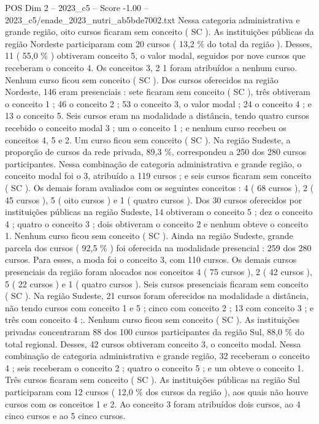 \begin{textsample}{POS Dim 2 – 2023\_c5 – Score -1.00 – 2023\_c5/enade\_2023\_nutri\_ab5bde7002.txt}
Nessa categoria administrativa e grande região, oito cursos ficaram sem conceito ( SC ).
As instituições públicas da região Nordeste participaram com 20 cursos ( 13,2 \% do total da região ).
Desses, 11 ( 55,0 \% ) obtiveram conceito 5, o valor modal, seguidos por nove cursos que receberam o conceito 4.
Os conceitos 3, 2 1 foram atribuídos a nenhum curso.
Nenhum curso ficou sem conceito ( SC ).
Dos cursos oferecidos na região Nordeste, 146 eram presenciais : sete ficaram sem conceito ( SC ), três obtiveram o conceito 1 ; 46 o conceito 2 ; 53 o conceito 3, o valor modal ; 24 o conceito 4 ; e 13 o conceito 5.
Seis cursos eram na modalidade a distância, tendo quatro cursos recebido o conceito modal 3 ; um o conceito 1 ; e nenhum curso recebeu os conceitos 4, 5 e 2.
Um curso ficou sem conceito ( SC ).
Na região Sudeste, a proporção de cursos da rede privada, 89,3 \%, correspondeu a 250 dos 280 cursos participantes.
Nessa combinação de categoria administrativa e grande região, o conceito modal foi o 3, atribuído a 119 cursos ; e seis cursos ficaram sem conceito ( SC ).
Os demais foram avaliados com os seguintes conceitos : 4 ( 68 cursos ), 2 ( 45 cursos ), 5 ( oito cursos ) e 1 ( quatro cursos ).
Dos 30 cursos oferecidos por instituições públicas na região Sudeste, 14 obtiveram o conceito 5 ; dez o conceito 4 ; quatro o conceito 3 ; dois obtiveram o conceito 2 e nenhum obteve o conceito 1.
Nenhum curso ficou sem conceito ( SC ).
Ainda na região Sudeste, grande parcela dos cursos ( 92,5 \% ) foi oferecida na modalidade presencial : 259 dos 280 cursos.
Para esses, a moda foi o conceito 3, com 110 cursos.
Os demais cursos presenciais da região foram alocados nos conceitos 4 ( 75 cursos ), 2 ( 42 cursos ), 5 ( 22 cursos ) e 1 ( quatro cursos ).
Seis cursos presenciais ficaram sem conceito ( SC ).
Na região Sudeste, 21 cursos foram oferecidos na modalidade a distância, não tendo cursos com conceito 1 e 5 ; cinco com conceito 2 ; 13 com conceito 3 ; e três com conceito 4 ;.
Nenhum curso ficou sem conceito ( SC ).
As instituições privadas concentraram 88 dos 100 cursos participantes da região Sul, 88,0 \% do total regional.
Desses, 42 cursos obtiveram conceito 3, o conceito modal.
Nessa combinação de categoria administrativa e grande região, 32 receberam o conceito 4 ; seis receberam o conceito 2 ; quatro o conceito 5 ; e um obteve o conceito 1.
Três cursos ficaram sem conceito ( SC ).
As instituições públicas na região Sul participaram com 12 cursos ( 12,0 \% dos cursos da região ), aos quais não houve cursos com os conceitos 1 e 2.
Ao conceito 3 foram atribuídos dois cursos, ao 4 cinco cursos e ao 5 cinco cursos.

\end{textsample}
